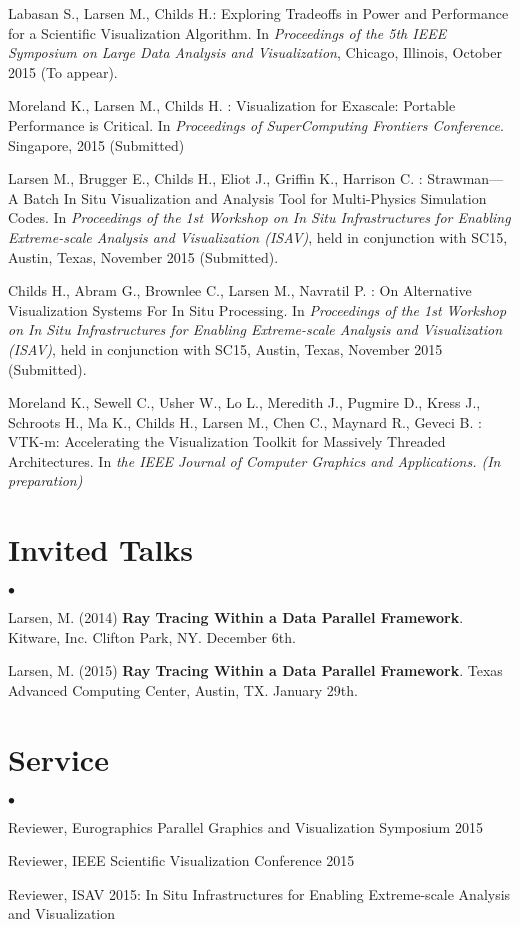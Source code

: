 \documentclass[margin,line]{res}
\newenvironment{list2}{
  \begin{list}{$\bullet$}{%
      \setlength{\itemsep}{0in}
      \setlength{\parsep}{0in} \setlength{\parskip}{0in}
      \setlength{\topsep}{0in} \setlength{\partopsep}{0in} 
      \setlength{\leftmargin}{0.2in}}}{\end{list}}
\begin{document}
\begin{resume}
Labasan S., Larsen M., Childs H.: Exploring Tradeoffs in Power and Performance for a Scientific Visualization Algorithm. In \textit{Proceedings of the 5th IEEE Symposium on Large Data Analysis and Visualization}, Chicago, Illinois, October 2015 (To appear).

Moreland K., Larsen M., Childs H. : Visualization for Exascale: Portable Performance is Critical. In \textit{Proceedings of SuperComputing Frontiers Conference}. Singapore, 2015 (Submitted)

Larsen M., Brugger E., Childs H., Eliot J., Griffin K., Harrison C. : Strawman---A Batch In Situ Visualization and Analysis Tool for Multi-Physics Simulation Codes. In \textit{Proceedings of the 1st Workshop on In Situ Infrastructures for Enabling Extreme-scale Analysis and Visualization (ISAV)}, held in conjunction with SC15, Austin, Texas, November 2015 (Submitted).

Childs H., Abram G., Brownlee C., Larsen M., Navratil P. : On Alternative Visualization Systems For In Situ Processing. In \textit{Proceedings of the 1st Workshop on In Situ Infrastructures for Enabling Extreme-scale Analysis and Visualization (ISAV)}, held in conjunction with SC15, Austin, Texas, November 2015 (Submitted).

Moreland K., Sewell C., Usher W., Lo L., Meredith J., Pugmire D., Kress J., Schroots H., Ma K., Childs H., Larsen M., Chen C., Maynard R., Geveci B. : VTK-m: Accelerating the Visualization Toolkit for Massively Threaded Architectures. In \textit{the IEEE Journal of  Computer Graphics and Applications. (In preparation)}

\section{\sc Invited Talks}
\begin{list2}
	\item Larsen, M. (2014) \textbf{Ray Tracing Within a Data Parallel Framework}. Kitware, Inc. Clifton Park, NY. December 6th. 
	\item Larsen, M. (2015) \textbf{Ray Tracing Within a Data Parallel Framework}. Texas Advanced Computing Center, Austin, TX. January 29th.
\end{list2}

\section{\sc Service}
\begin{list2}
	\item Reviewer, Eurographics Parallel Graphics and Visualization Symposium 2015 
	\item Reviewer, IEEE Scientific Visualization Conference 2015
	\item Reviewer, ISAV 2015: In Situ Infrastructures for Enabling Extreme-scale Analysis and Visualization 
\end{list2}


\end{resume}
\end{document}
